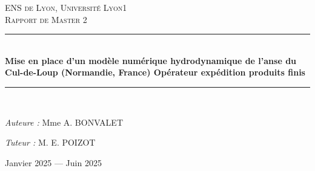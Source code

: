 \documentclass[10pt,a4paper,titlepage]{article}
\newcommand{\HRule}{\rule{\linewidth}{0.5mm}}
\begin{document}
    
    \begin{titlepage}
        \begin{sffamily}
            \begin{center}
                
                
                \textsc{\LARGE ENS de Lyon, Université Lyon1}\\[2cm]
                
                \textsc{\Large Rapport de Master 2}\\[1.5cm]
                
                \HRule \\[0.4cm]
                { \huge \bfseries Mise en place d’un modèle numérique hydrodynamique de l’anse du Cul-de-Loup (Normandie, France) Opérateur expédition produits finis\\ [0.4cm] }
                
                \HRule \\[2cm]
                
                \begin{minipage}{0.4\textwidth}
                    \begin{flushleft} \large
                        \emph{Auteure :} Mme \textsc{A. BONVALET}\\
                    \end{flushleft}
                \end{minipage}
                \begin{minipage}{0.4\textwidth}
                    \begin{flushright} \large
                        \emph{Tuteur :} M. \textsc{E. POIZOT}\\
                    \end{flushright}
                \end{minipage}
                
                \vfill
                
                {\large Janvier 2025 — Juin 2025}
                
            \end{center}
        \end{sffamily}
    \end{titlepage}
    
\end{document}
